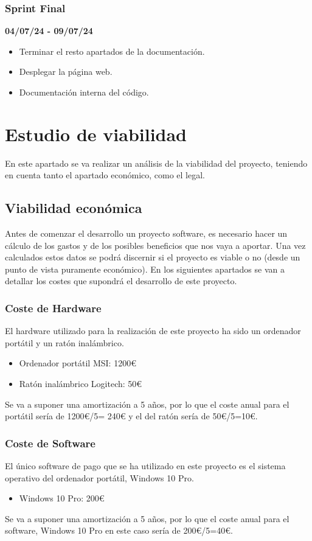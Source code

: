\subsubsection{Sprint Final}
\textbf{04/07/24 - 09/07/24}
\begin{itemize}
    \item Terminar el resto apartados de la documentación.
    \item Desplegar la página web.
    \item Documentación interna del código.
\end{itemize}

\section{Estudio de viabilidad}
En este apartado se va realizar un análisis de la viabilidad del proyecto, teniendo en cuenta tanto el apartado económico, como el legal. 

\subsection{Viabilidad económica}
Antes de comenzar el desarrollo un proyecto software, es necesario hacer un cálculo de los gastos y de los posibles beneficios que nos vaya a aportar. Una vez calculados estos datos se podrá discernir si el proyecto es viable o no (desde un punto de vista puramente económico).
En los siguientes apartados se van a detallar los costes que supondrá el desarrollo de este proyecto. 

\subsubsection{Coste de Hardware}
El hardware utilizado para la realización de este proyecto ha sido un ordenador portátil y un ratón inalámbrico. 
\begin{itemize}
    \item Ordenador portátil MSI: 1200€
    \item Ratón inalámbrico Logitech: 50€
\end{itemize}
Se va a suponer una amortización a 5 años, por lo que el coste anual para el portátil sería de 1200€/5= 240€ y el del ratón sería de 50€/5=10€.

\subsubsection{Coste de Software}
El único software de pago que se ha utilizado en este proyecto es el sistema operativo del ordenador portátil, Windows 10 Pro.
\begin{itemize}
    \item Windows 10 Pro: 200€
\end{itemize}
Se va a suponer una amortización a 5 años, por lo que el coste anual para el software, Windows 10 Pro en este caso sería de 200€/5=40€.

